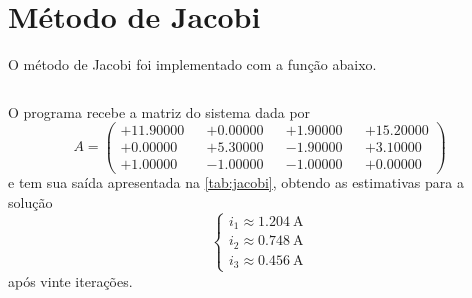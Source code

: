 \documentclass[portuguese,minted]{artigo}
\begin{document}
\section{Método de Jacobi}
O método de Jacobi foi implementado com a função abaixo.
\inputminted[firstline=65,lastline=107]{c}{src/main.c}

O programa recebe a matriz do sistema dada por
\begin{equation*}
    A = \begin{pmatrix}
        +11.90000&&+0.00000&&+1.90000&&+15.20000\\
        +0.00000&&+5.30000&&-1.90000&&+3.10000\\
        +1.00000&&-1.00000&&-1.00000&&+0.00000
    \end{pmatrix}
\end{equation*}
e tem sua saída apresentada na \cref{tab:jacobi}, obtendo as estimativas para a solução
\begin{equation*}
    \begin{cases}
        i_1 \approx \SI{1.204}{\ampere}\\
        i_2 \approx \SI{0.748}{\ampere}\\
        i_3 \approx \SI{0.456}{\ampere}
    \end{cases}
\end{equation*}
após vinte iterações.
\end{document}
